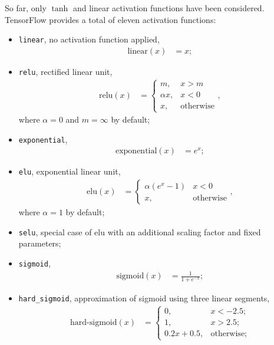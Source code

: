 So far, only $\tanh$ and linear activation functions have been considered.
TensorFlow provides a total of eleven activation functions:
\begin{itemize}
    \item\texttt{linear}, no activation function applied,
        \begin{align*}
            \text{linear}(x) &= x;
        \end{align*}

    \item\texttt{relu}, rectified linear unit,
        \begin{align*}
            \text{relu}(x) &= \begin{cases}
                m, & x > m\\
                \alpha x, & x < 0\\
                x, & \text{otherwise}
            \end{cases},
        \end{align*}
        where $\alpha = 0$ and $m = \infty$ by default;

    \item\texttt{exponential},
        \begin{align*}
            \text{exponential}(x) &= e^x;
        \end{align*}

    \item\texttt{elu}, exponential linear unit,
        \begin{align*}
            \text{elu}(x) &= \begin{cases}
                \alpha (e^x - 1) & x < 0\\
                x, & \text{otherwise}
            \end{cases},
        \end{align*}
        where $\alpha = 1$ by default;

    \item\texttt{selu}, special case of elu with an additional scaling factor
        and fixed parameters;

    \item\texttt{sigmoid},
        \begin{align*}
            \text{sigmoid}(x) &= \frac{1}{1 + e^{-x}};
        \end{align*}

    \item\texttt{hard\_sigmoid}, approximation of sigmoid using three linear
        segments,
        \begin{align*}
            \text{hard-sigmoid}(x) &= \begin{cases}
                0, & x < -2.5;\\
                1, & x > 2.5;\\
                0.2x + 0.5, & \text{otherwise};
            \end{cases}
        \end{align*}


\end{itemize}
